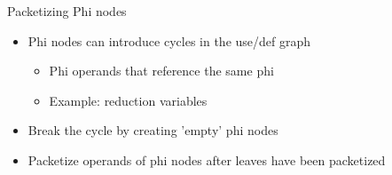 \begin{frame}[fragile]{Packetizing Phi nodes}

\begin{itemize}
    \item Phi nodes can introduce cycles in the use/def graph
    \begin{itemize}
        \item Phi operands that reference the same phi
        \item Example: reduction variables
    \end{itemize}
    \item Break the cycle by creating 'empty' phi nodes
    \item Packetize operands of phi nodes after leaves have been packetized
\end{itemize}


\end{frame}


